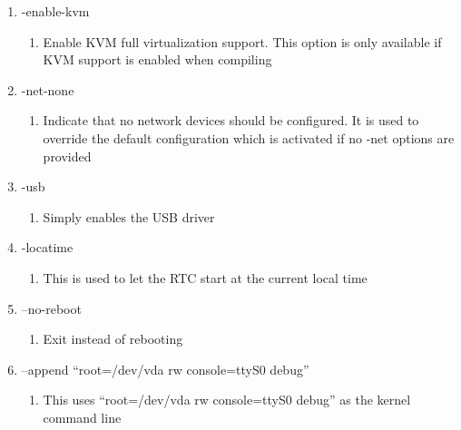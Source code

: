 \documentclass[letterpaper,10pt,fleqn]{article}
\begin{document}
\begin{enumerate}
\item -enable-kvm
	\begin{enumerate}
		\item Enable KVM full virtualization support. This option is only available if KVM support is enabled when compiling
	\end{enumerate}

\item -net-none
	\begin{enumerate}
		\item Indicate that no network devices should be configured. It is used to override the default configuration which is activated if no -net options are provided
	\end{enumerate}

\item -usb
	\begin{enumerate}
		\item Simply enables the USB driver
	\end{enumerate}

\item -locatime
	\begin{enumerate}
		\item This is used to let the RTC start at the current local time
	\end{enumerate}

\item --no-reboot
	\begin{enumerate}
	\item Exit instead of rebooting
	\end{enumerate}

\item --append “root=/dev/vda rw console=ttyS0 debug”
	\begin{enumerate}
	\item This uses “root=/dev/vda rw console=ttyS0 debug” as the kernel command line
	\end{enumerate}

\end{enumerate}
\end{document}
